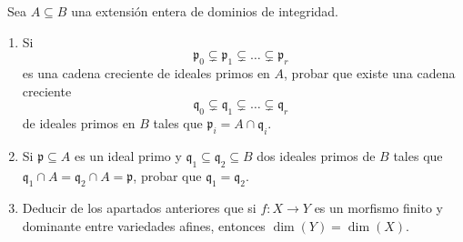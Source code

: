 \documentclass[twoside]{article}
\begin{document}
\newpage

\begin{ejercicio}{3}\
Sea $A \subseteq B$ una extensión entera de dominios de integridad.
 
\begin{enumerate}
\item\label{1} Si
$$\mathfrak{p}_0 \subsetneq \mathfrak{p}_1 \subsetneq \dots \subsetneq \mathfrak{p}_r$$
es una cadena creciente de ideales primos en $A$, probar que existe una
cadena creciente
$$\mathfrak{q}_0 \subsetneq \mathfrak{q}_1 \subsetneq \dots \subsetneq \mathfrak{q}_r$$
de ideales primos en $B$ tales que $\mathfrak{p}_i = A \cap \mathfrak{q}_i$.
\item\label{2} Si $\mathfrak{p} \subseteq A$ es un ideal primo y $\mathfrak{q}_1 \subseteq \mathfrak{q}_2 \subseteq B$ dos ideales primos de $B$ tales
que $\mathfrak{q}_1 \cap A = \mathfrak{q}_2 \cap A = \mathfrak{p}$, probar que $\mathfrak{q}_1 = \mathfrak{q}_2$.
\item Deducir de los apartados anteriores que si $f : X \to Y$ es un morfismo
finito y dominante entre variedades afines, entonces $\dim(Y ) = \dim(X)$.

\end{enumerate}
\end{ejercicio}
\end{document}
